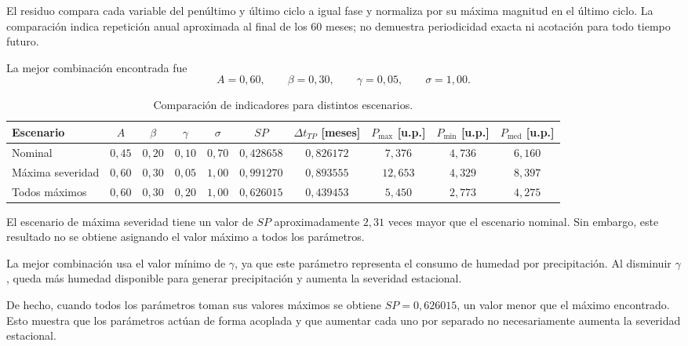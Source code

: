 El residuo compara cada variable del penúltimo y último ciclo a igual fase y normaliza por su máxima magnitud en el último ciclo. La comparación indica repetición anual aproximada al final de los 60 meses; no demuestra periodicidad exacta ni acotación para todo tiempo futuro.

La mejor combinación encontrada fue
\[
    \boxed{
    A=0{,}60,\qquad
    \beta=0{,}30,\qquad
    \gamma=0{,}05,\qquad
    \sigma=1{,}00.}
\]

\begin{table}[H]
    \centering
    \small
    \caption{Comparación de indicadores para distintos escenarios.}
    \label{tab:parte2-comparacion}
    \begin{tabular}{@{} l c c c c c c c c c @{}}
        \toprule
        Escenario & $A$ & $\beta$ & $\gamma$ & $\sigma$ &
        $SP$ & $\Delta t_{TP}$ [meses] & $P_{\max}$ [u.p.] &
        $P_{\min}$ [u.p.] & $P_{\mathrm{med}}$ [u.p.] \\
        \midrule
        Nominal
        & $0{,}45$ & $0{,}20$ & $0{,}10$ & $0{,}70$
        & $0{,}428658$ & $0{,}826172$ & $7{,}376$ & $4{,}736$ & $6{,}160$ \\
        Máxima severidad
        & $0{,}60$ & $0{,}30$ & $0{,}05$ & $1{,}00$
        & $0{,}991270$ & $0{,}893555$ & $12{,}653$ & $4{,}329$ & $8{,}397$ \\
        Todos máximos
        & $0{,}60$ & $0{,}30$ & $0{,}20$ & $1{,}00$
        & $0{,}626015$ & $0{,}439453$ & $5{,}450$ & $2{,}773$ & $4{,}275$ \\
        \bottomrule
    \end{tabular}
\end{table}

El escenario de máxima severidad tiene un valor de $SP$ aproximadamente
$2{,}31$ veces mayor que el escenario nominal. Sin embargo, este resultado
no se obtiene asignando el valor máximo a todos los parámetros.

La mejor combinación usa el valor mínimo de $\gamma$, ya que este parámetro
representa el consumo de humedad por precipitación. Al disminuir $\gamma$,
queda más humedad disponible para generar precipitación y aumenta la
severidad estacional.

De hecho, cuando todos los parámetros toman sus valores máximos se obtiene
$SP=0{,}626015$, un valor menor que el máximo encontrado. Esto muestra que
los parámetros actúan de forma acoplada y que aumentar cada uno por separado
no necesariamente aumenta la severidad estacional.


